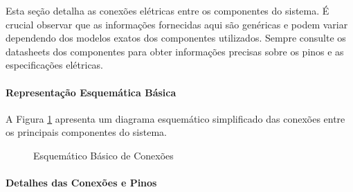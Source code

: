 
Esta seção detalha as conexões elétricas entre os componentes do sistema. É crucial observar que as informações fornecidas aqui são genéricas e podem variar dependendo dos modelos exatos dos componentes utilizados. Sempre consulte os datasheets dos componentes para obter informações precisas sobre os pinos e as especificações elétricas.

\paragraph{Representação Esquemática Básica}

A Figura \ref{fig:esquematico_basico} apresenta um diagrama esquemático simplificado das conexões entre os principais componentes do sistema.

\begin{figure}[H]
    \centering
    \caption{Esquemático Básico de Conexões}
    \label{fig:esquematico_basico}
\end{figure}

\paragraph{Detalhes das Conexões e Pinos}

